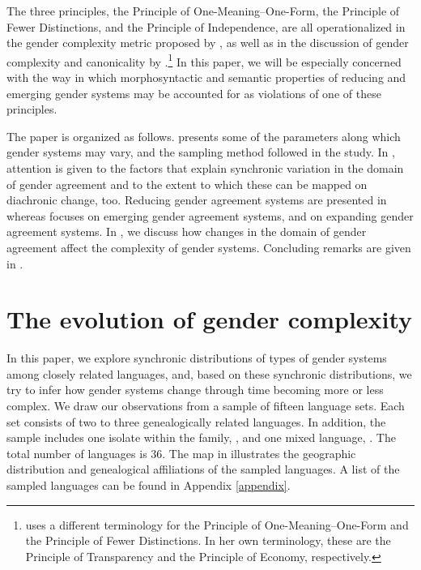 \documentclass[output=collectionpaper]{langsci/langscibook}
\begin{document}
The three principles, the Principle of One-Meaning–One-Form, the Principle of Fewer Distinctions, and the Principle of Independence, are all operationalized in the gender complexity metric proposed by \citet{DiGarbo2014,DiGarbo2016}, as well as in the discussion of gender complexity and canonicality by .\footnote{ uses a different terminology for the Principle of One-Meaning--One-Form and the Principle of Fewer Distinctions. In her own terminology, these are the Principle of Transparency and the Principle of Economy, respectively.} In this paper, we will be especially concerned with the way in which morphosyntactic and semantic properties of reducing and emerging gender systems may be accounted for as violations of one of these principles.

The paper is organized as follows.  presents some of the parameters along which gender systems may vary, and the sampling method followed in the study. In , attention is given to the factors that explain synchronic variation in the domain of gender agreement and to the extent to which these can be mapped on diachronic change, too. Reducing gender agreement systems are presented in  whereas  focuses on emerging gender agreement systems, and  on expanding gender agreement systems. In  , we discuss how changes in the domain of gender agreement affect the complexity of gender systems. Concluding remarks are given in .



\section{The evolution of gender complexity}
\label{sec:dgm:evolution}

In this paper, we explore synchronic distributions of types of gender systems among closely related languages, and, based on these synchronic distributions, we try to infer how gender systems change through time becoming more or less complex. We draw our observations from a sample of fifteen language sets. Each set consists of two to three genealogically related languages. In addition, the sample includes one isolate within the  family, , and one mixed language, . The total number of languages is 36. The map in  illustrates the geographic distribution and genealogical affiliations of the sampled languages. A list of the sampled languages can be found in Appendix \ref{appendix}.
\end{document}
